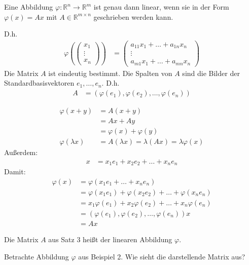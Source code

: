 Eine Abbildung $\varphi : \mathbb{R}^n \rightarrow \mathbb{R}^m$ ist genau dann linear, wenn sie in der Form $\varphi(x) = Ax$ mit $A \in \mathbb{R}^{m \times n}$ geschrieben werden kann.

D.h.
\begin{align*}
	\varphi\left(\begin{pmatrix}x_1\\\vdots\\x_n\end{pmatrix}\right) &= \begin{pmatrix}
		a_{11}x_1 + \dots + a_{1n}x_n \\
		\vdots \\
		a_{m1}x_1 + \dots + a_{mn}x_n
	\end{pmatrix}
\end{align*}
Die Matrix $A$ ist eindeutig bestimmt. Die Spalten von $A$ sind die Bilder der Standardbasisvektoren $e_1,\dots,e_n$. D.h.
\begin{align*}
	A &= (\varphi(e_1),\varphi(e_2),\dots,\varphi(e_n))
\end{align*}

\begin{align*}
	\varphi(x + y) &= A(x + y) \\
	&= Ax + Ay \\
	&= \varphi(x) + \varphi(y) \\
	\varphi(\lambda x) &= A(\lambda x) = \lambda(Ax) = \lambda\varphi(x)
\end{align*}
Außerdem:
\begin{align*}
	x &= x_1e_1 + x_2e_2 + \dots + x_ne_n
\end{align*}
Damit:
\begin{align*}
	\varphi(x) &= \varphi(x_1e_1 + \dots + x_ne_n) \\
	&= \varphi(x_1e_1) + \varphi(x_2e_2) + \dots + \varphi(x_ne_n) \\
	&= x_1\varphi(e_1) + x_2\varphi(e_2) + \dots + x_n\varphi(e_n) \\
	&= (\varphi(e_1),\varphi(e_2),\dots,\varphi(e_n))x \\
	&= Ax
\end{align*}

Die Matrix $A$ aus Satz 3 heißt  der linearen Abbildung $\varphi$.

Betrachte Abbildung $\varphi$ aus Beispiel 2. Wie sieht die darstellende Matrix aus?

